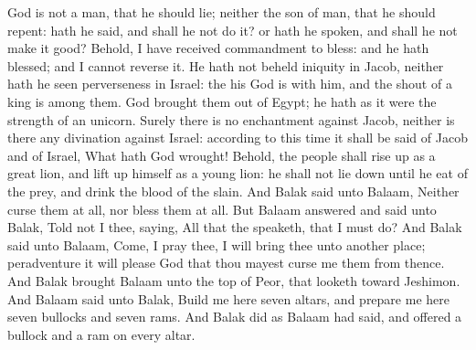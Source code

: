 \begin{biblechapter}
\verse God is not a man, that he should lie; neither the son of man, that he should repent: hath he said, and shall he not do it? or hath he spoken, and shall he not make it good?
\verse Behold, I have received commandment to bless: and he hath blessed; and I cannot reverse it.
\verse He hath not beheld iniquity in Jacob, neither hath he seen perverseness in Israel: the \LORD his God is with him, and the shout of a king is among them.
\verse God brought them out of Egypt; he hath as it were the strength of an unicorn.
\verse Surely there is no enchantment against Jacob, neither is there any divination against Israel: according to this time it shall be said of Jacob and of Israel, What hath God wrought!
\verse Behold, the people shall rise up as a great lion, and lift up himself as a young lion: he shall not lie down until he eat of the prey, and drink the blood of the slain.
\verse And Balak said unto Balaam, Neither curse them at all, nor bless them at all.
\verse But Balaam answered and said unto Balak, Told not I thee, saying, All that the \LORD speaketh, that I must do?
 And Balak said unto Balaam, Come, I pray thee, I will bring thee unto another place; peradventure it will please God that thou mayest curse me them from thence.
\verse And Balak brought Balaam unto the top of Peor, that looketh toward Jeshimon.
\verse And Balaam said unto Balak, Build me here seven altars, and prepare me here seven bullocks and seven rams.
\verse And Balak did as Balaam had said, and offered a bullock and a ram on every altar.
\end{biblechapter}

